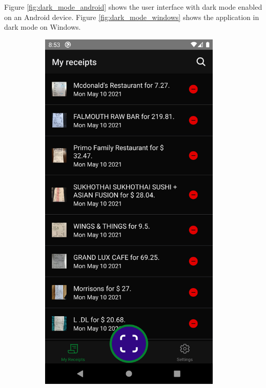 \documentclass[
  digital, %
  table,   %
  oneside, %
  lof,     %
  lot,     %
]{fithesis3}
\newcommand\half{0.45}
\newcommand\subfigsize{0.95}
\begin{document}
Figure \ref{fig:dark_mode_android} shows the user interface with dark mode enabled on an Android device. Figure \ref{fig:dark_mode_windows} shows the application in dark mode on Windows.

\begin{figure}
    \centering
    \begin{subfigure}[t]{\half\textwidth}
      \centering
      \includegraphics[width=\subfigsize\textwidth]{figures/screens/android/dark/receipts_list}

\end{subfigure}
\end{figure}
\end{document}
